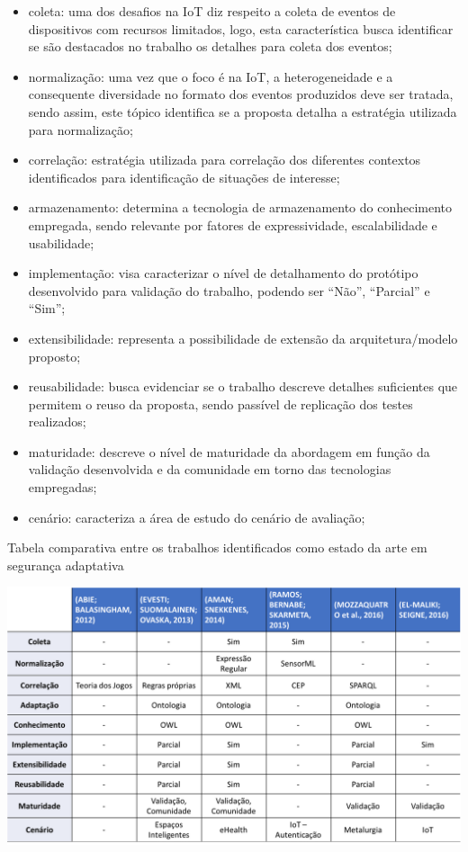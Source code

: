 \documentclass[tid,table]{texufpel} %
\begin{document}
\begin{itemize}
\item coleta: uma dos desafios na IoT diz respeito a coleta de eventos de dispositivos com recursos limitados, logo, esta característica busca identificar se são destacados no trabalho os detalhes para coleta dos eventos;
\item normalização: uma vez que o foco é na IoT, a heterogeneidade e a consequente diversidade no formato dos eventos produzidos deve ser tratada, sendo assim, este tópico identifica se a proposta detalha a estratégia utilizada para normalização;
\item correlação: estratégia utilizada para correlação dos diferentes contextos identificados para identificação de situações de interesse;
\item armazenamento: determina a tecnologia de armazenamento do conhecimento empregada, sendo relevante por fatores de expressividade, escalabilidade e usabilidade;
\item implementação: visa caracterizar o nível de detalhamento do protótipo desenvolvido para validação do trabalho, podendo ser 
``Não'', ``Parcial'' e ``Sim'';
\item extensibilidade: representa a possibilidade de extensão da arquitetura/modelo proposto;
\item reusabilidade: busca evidenciar se o trabalho descreve detalhes suficientes que permitem o reuso da proposta, sendo passível de replicação dos testes realizados;
\item maturidade: descreve o nível de maturidade da abordagem em função da validação desenvolvida e da comunidade em torno das tecnologias empregadas;
\item cenário: caracteriza a área de estudo do cenário de avaliação;
\end{itemize}

\begin{table}[ht]
\centering
\caption{Tabela comparativa entre os trabalhos identificados como estado da arte em segurança adaptativa}
\includegraphics[width=1.0\textwidth]{imagens/comparacao-estado-da-arte.png}
\label{comparacao-estado-da-arte}
\end{table}
\end{document}
